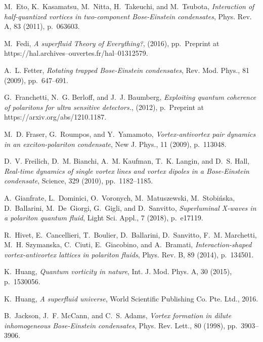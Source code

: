 \documentclass[aps,prb,twocolumn,superscriptaddress,nofootinbib]{revtex4}
\begin{document}
\begin{thebibliography}{10}
{\sc M.~Eto, K.~Kasamatsu, M.~Nitta, H.~Takeuchi, and M.~Tsubota}, {\em
  Interaction of half-quantized vortices in two-component {Bose}-{Einstein}
  condensates}, Phys. Rev. A, 83 (2011), p.~063603.

{\sc M.~Fedi}, {\em {A superfluid Theory of Everything?}},  (2016),
  pp.~Preprint at https://hal.archives--ouvertes.fr/hal--01312579.

{\sc A.~L. Fetter}, {\em Rotating trapped {Bose-Einstein} condensates}, Rev.
  Mod. Phys., 81 (2009), pp.~647--691.

{\sc G.~Franchetti, N.~G. Berloff, and J.~J. Baumberg}, {\em {Exploiting
  quantum coherence of polaritons for ultra sensitive detectors.}},  (2012),
  p.~Preprint at https://arxiv.org/abs/1210.1187.

{\sc M.~D. Fraser, G.~Roumpos, and Y.~Yamamoto}, {\em Vortex-antivortex pair
  dynamics in an exciton-polariton condensate}, New J. Phys., 11 (2009),
  p.~113048.

{\sc D.~V. Freilich, D.~M. Bianchi, A.~M. Kaufman, T.~K. Langin, and D.~S.
  Hall}, {\em Real-time dynamics of single vortex lines and vortex dipoles in a
  {Bose-Einstein} condensate}, Science, 329 (2010), pp.~1182--1185.

{\sc A.~Gianfrate, L.~Dominici, O.~Voronych, M.~Matuszewski, M.~Stobi\'{n}ska,
  D.~Ballarini, M.~De~Giorgi, G.~Gigli, and D.~Sanvitto}, {\em Superluminal
  {X-waves} in a polariton quantum fluid}, Light Sci. Appl., 7 (2018),
  p.~e17119.

{\sc R.~Hivet, E.~Cancellieri, T.~Boulier, D.~Ballarini, D.~Sanvitto, F.~M.
  Marchetti, M.~H. Szymanska, C.~Ciuti, E.~Giacobino, and A.~Bramati}, {\em
  Interaction-shaped vortex-antivortex lattices in polariton fluids}, Phys.
  Rev. B, 89 (2014), p.~134501.

{\sc K.~Huang}, {\em Quantum vorticity in nature}, Int. J. Mod. Phys. A, 30
  (2015), p.~1530056.

{\sc K.~Huang}, {\em A superfluid universe}, World Scientific Publishing Co.
  Pte. Ltd., 2016.

{\sc B.~Jackson, J.~F. McCann, and C.~S. Adams}, {\em Vortex formation in
  dilute inhomogeneous {Bose-Einstein} condensates}, Phys. Rev. Lett., 80
  (1998), pp.~3903--3906.


\end{thebibliography}
\end{document}
